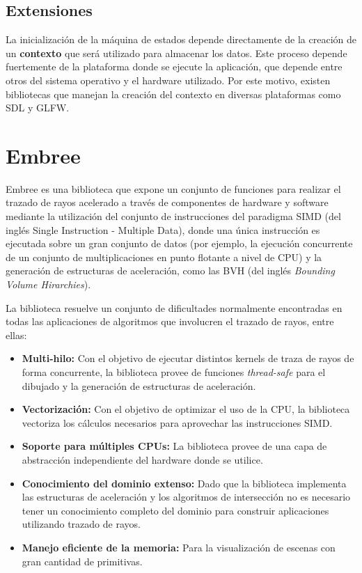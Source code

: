 \subsection{Extensiones}
La inicialización de la máquina de estados depende directamente de la creación de un \textbf{contexto} que será utilizado para almacenar los datos. Este proceso depende fuertemente de la plataforma donde se ejecute la aplicación, que depende entre otros del sistema operativo y el hardware utilizado. Por este motivo, existen bibliotecas que manejan la creación del contexto en diversas plataformas como SDL y GLFW.
	
\section{Embree}
Embree es una biblioteca que expone un conjunto de funciones para realizar el trazado de rayos acelerado a través de componentes de hardware y software mediante la utilización del conjunto de instrucciones del paradigma SIMD (del inglés Single Instruction - Multiple Data), donde una única instrucción es ejecutada sobre un gran conjunto de datos (por ejemplo, la ejecución concurrente de un conjunto de multiplicaciones en punto flotante a nivel de CPU) y la generación de estructuras de aceleración, como las BVH (del inglés \textit{Bounding Volume Hirarchies}).

La biblioteca resuelve un conjunto de dificultades normalmente encontradas en todas las aplicaciones de algoritmos que involucren el trazado de rayos, entre ellas:

\begin{itemize}
	\item \textbf{Multi-hilo:} Con el objetivo de ejecutar distintos kernels de traza de rayos de forma concurrente, la biblioteca provee de funciones \textit{thread-safe} para el dibujado y la generación de estructuras de aceleración.
	\item \textbf{Vectorización:} Con el objetivo de optimizar el uso de la CPU, la biblioteca vectoriza los cálculos necesarios para aprovechar las instrucciones SIMD.
	\item \textbf{Soporte para múltiples CPUs:} La biblioteca provee de una capa de abstracción independiente del hardware donde se utilice.
	\item \textbf{Conocimiento del dominio extenso:} Dado que la biblioteca implementa las estructuras de aceleración y los algoritmos de intersección no es necesario tener un conocimiento completo del dominio para construir aplicaciones utilizando trazado de rayos.
	\item \textbf{Manejo eficiente de la memoria:} Para la visualización de escenas con gran cantidad de primitivas.
\end{itemize} 

